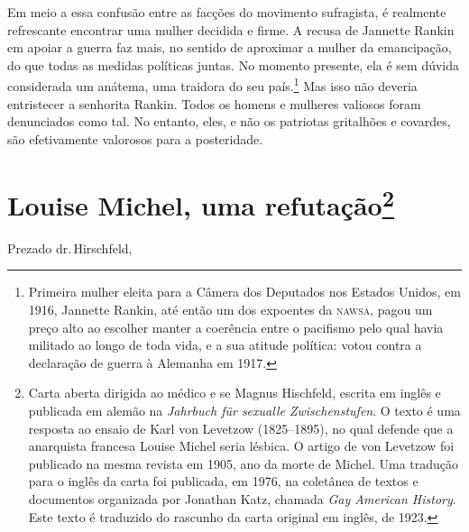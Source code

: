 Em meio a essa confusão entre as facções do movimento sufragista, é
realmente refrescante encontrar uma mulher decidida e firme. A recusa de
Jannette Rankin em apoiar a guerra faz mais, no sentido de aproximar a
mulher da emancipação, do que todas as medidas políticas juntas. No
momento presente, ela é sem dúvida considerada um anátema, uma traidora
do seu país.\footnote{Primeira mulher eleita para a Câmera dos Deputados
  nos Estados Unidos, em 1916, Jannette Rankin, até então um dos
  expoentes da \textsc{nawsa}, pagou um preço alto ao escolher manter a coerência
  entre o pacifismo pelo qual havia militado ao longo de toda vida, e a
  sua atitude política: votou contra a declaração de guerra à Alemanha
  em 1917.} Mas isso não deveria entristecer a senhorita Rankin. Todos
os homens e mulheres valiosos foram denunciados como tal. No entanto,
eles, e não os patriotas gritalhões e covardes, são efetivamente valorosos
para a posteridade.

\chapter{Louise Michel, uma refutação\footnote{Carta aberta dirigida ao médico e
  se Magnus Hischfeld, escrita em inglês e publicada em alemão na
  \emph{Jahrbuch für sexualle Zwischenstufen}. O texto é uma resposta ao ensaio
  de Karl von Levetzow (1825--1895), no qual defende que a anarquista francesa
  Louise Michel seria lésbica. O artigo de von Levetzow foi publicado na
  mesma revista em 1905, ano da morte de Michel. Uma tradução para o
  inglês da carta foi publicada, em 1976, na coletânea de textos e
  documentos organizada por Jonathan Katz, chamada \emph{Gay American
  History}. Este texto é traduzido do rascunho da carta original em
  inglês, de 1923.}}

Prezado dr.\,Hirschfeld,

\smallskip 

